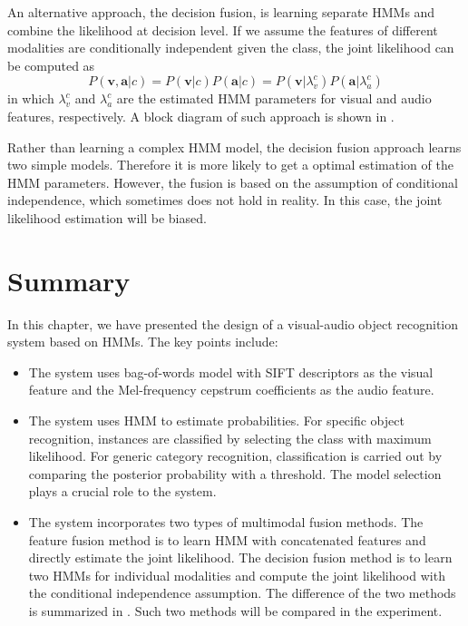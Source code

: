 \documentclass[12pt,final,twoside]{report}
\begin{document}
An alternative approach, the decision fusion, is learning separate HMMs and combine the likelihood at decision level. If we assume the features of different modalities are conditionally independent given the class, the joint likelihood can be computed as
\begin{equation}
  P(\mathbf{v},\mathbf{a}|c) = P(\mathbf{v}|c) P(\mathbf{a}|c) = P(\mathbf{v}|\lambda_v^c) P(\mathbf{a}|\lambda_a^c)
\end{equation}
in which $\lambda_{v}^c$ and $\lambda_{a}^c$ are the estimated HMM parameters for visual and audio features, respectively. A block diagram of such approach is shown in .

Rather than learning a complex HMM model, the decision fusion approach learns two simple models. Therefore it is more likely to get a optimal estimation of the HMM parameters. However, the fusion is based on the assumption of conditional independence, which sometimes does not hold in reality. In this case, the joint likelihood estimation will be biased.

\section{Summary}
In this chapter, we have presented the design of a visual-audio object recognition system based on HMMs. The key points include:
\begin{itemize}
  \item The system uses bag-of-words model with SIFT descriptors as the visual feature and the Mel-frequency cepstrum coefficients as the audio feature.
  \item The system uses HMM to estimate probabilities. For specific object recognition, instances are classified by selecting the class with maximum likelihood. For generic category recognition, classification is carried out by comparing the posterior probability with a threshold. The model selection plays a crucial role to the system.
  \item The system incorporates two types of multimodal fusion methods. The feature fusion method is to learn HMM with concatenated features and directly estimate the joint likelihood. The decision fusion method is to learn two HMMs for individual modalities and compute the joint likelihood with the conditional independence assumption. The difference of the two methods is summarized in . Such two methods will be compared in the experiment.
\end{itemize}
\end{document}
